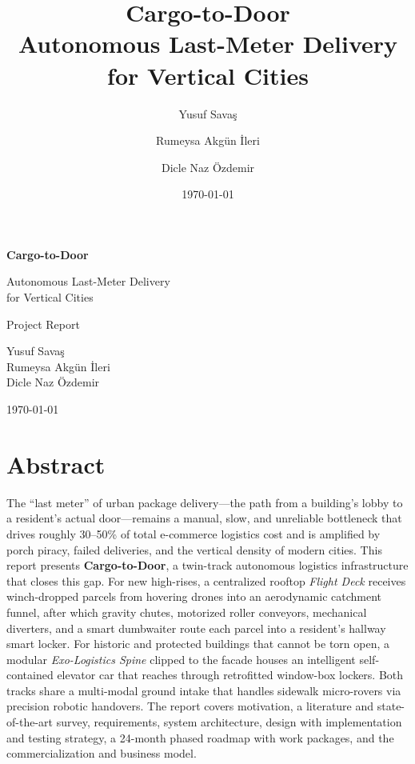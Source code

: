 \documentclass[11pt,a4paper]{report}
\title{\Huge \textbf{Cargo-to-Door} \\[0.4em]
       \LARGE Autonomous Last-Meter Delivery for Vertical Cities}
\author{Yusuf Sava\c{s} \and Rumeysa Akg\"un \.Ileri \and Dicle Naz \"Ozdemir}
\date{\today}
\begin{document}
\begin{titlepage}
    \centering
    \vspace*{2.5cm}
    {\Huge\bfseries Cargo-to-Door\par}
    \vspace{0.6cm}
    {\LARGE Autonomous Last-Meter Delivery\\[0.2em] for Vertical Cities\par}
    \vspace{1.5cm}
    {\large Project Report\par}
    \vfill
    {\large
        Yusuf Sava\c{s}\\[0.2em]
        Rumeysa Akg\"un \.Ileri\\[0.2em]
        Dicle Naz \"Ozdemir\\
    }
    \vfill
    {\large \today\par}
\end{titlepage}

\chapter*{Abstract}

The ``last meter'' of urban package delivery---the path from a building's
lobby to a resident's actual door---remains a manual, slow, and unreliable
bottleneck that drives roughly 30--50\% of total e-commerce logistics cost
and is amplified by porch piracy, failed deliveries, and the vertical
density of modern cities. This report presents \textbf{Cargo-to-Door}, a
twin-track autonomous logistics infrastructure that closes this gap. For
new high-rises, a centralized rooftop \emph{Flight Deck} receives
winch-dropped parcels from hovering drones into an aerodynamic catchment
funnel, after which gravity chutes, motorized roller conveyors, mechanical
diverters, and a smart dumbwaiter route each parcel into a resident's
hallway smart locker. For historic and protected buildings that cannot
be torn open, a modular \emph{Exo-Logistics Spine} clipped to the facade
houses an intelligent self-contained elevator car that reaches through
retrofitted window-box lockers. Both tracks share a multi-modal ground
intake that handles sidewalk micro-rovers via precision robotic
handovers. The report covers motivation, a literature and state-of-the-art
survey, requirements, system architecture, design with implementation and
testing strategy, a 24-month phased roadmap with work packages, and the
commercialization and business model.
\end{document}
